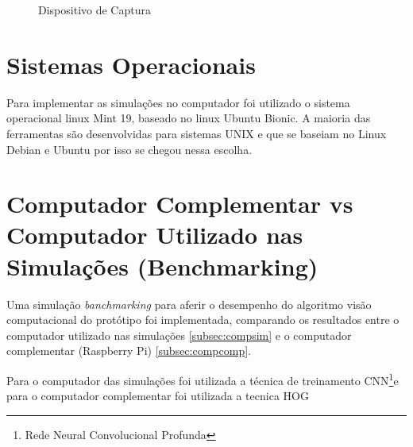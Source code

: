 \begin{figure}[H]
	\centering	
	\caption{Dispositivo de Captura}
	\def\svgwidth{10cm}
	
	\label{fig:cam}
\end{figure}

\section{Sistemas Operacionais}

Para implementar as simulações no computador foi utilizado o sistema operacional linux Mint 19, baseado no linux Ubuntu Bionic.
A maioria das ferramentas são desenvolvidas para sistemas UNIX e que se baseiam no Linux Debian e Ubuntu por isso se chegou nessa escolha.



\section{Computador Complementar vs Computador Utilizado nas Simulações (Benchmarking)}

Uma simulação \textit{banchmarking} para aferir o desempenho do algoritmo visão computacional do protótipo foi implementada, comparando os resultados entre o computador utilizado nas simulações \ref{subsec:compsim} e o computador complementar (Raspberry Pi) \ref{subsec:compcomp}.

Para o computador das simulações foi utilizada a técnica de treinamento CNN\footnote{Rede Neural Convolucional Profunda}e para o computador complementar foi utilizada a tecnica HOG  



